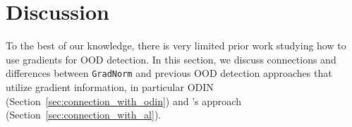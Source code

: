 \documentclass{article}
\begin{document}




\vspace{-0.2cm}
\section{Discussion}
\label{sec:discussion}
\vspace{-0.2cm}
To the best of our knowledge, there is very limited prior work studying how to use gradients for OOD detection.  In this section, we discuss connections and differences between \texttt{GradNorm} and previous OOD detection approaches that utilize gradient information, in particular ODIN (Section~\ref{sec:connection_with_odin}) and \citeauthor{lee2020gradients}'s approach (Section~\ref{sec:connection_with_al}).

\end{document}
